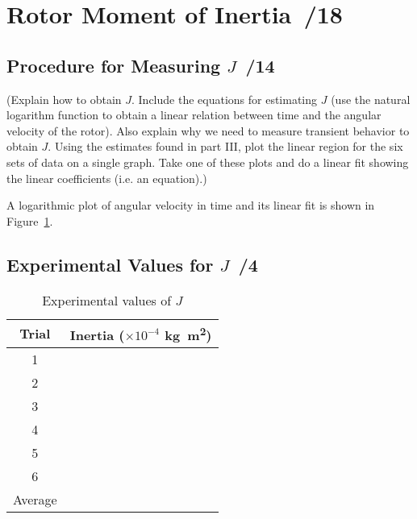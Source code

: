 \documentclass{article}
\newcommand{\score}{\hfill \underline{\hspace{0.65cm}}\,/} %
\begin{document}
\section{Rotor Moment of Inertia \score 18}
\subsection{Procedure for Measuring $J$ \score 14}
(Explain how to obtain $J$. Include the equations for estimating $J$ (use the natural logarithm function to obtain a linear relation between time and the angular velocity of the rotor). Also explain why we need to measure transient behavior to obtain $J$. Using the estimates found in part III, plot the linear region for the six sets of data on a single graph. Take one of these plots and do a linear fit showing the linear coefficients (i.e. an equation).)

A logarithmic plot of angular velocity in time and its linear fit is shown in Figure~\ref{fig:lab4_q5}.



\subsection{Experimental Values for $J$ \score 4}
\begin{table}[phtb] \label{fig:lab4_q5}
\begin{center}
\caption{Experimental values of $J$}
\begin{tabular}{c|l}\hline \hline
\cellcolor{lightgray} Trial & \cellcolor{lightgray} Inertia ($\times10^{-4}$ \si{\kg\m\squared}) \\
\hline
1 &  \\ \hline
2 &  \\ \hline
3 &  \\ \hline
4 &  \\ \hline
5 &  \\ \hline
6 &  \\ \hline
Average &  \\ \hline
\end{tabular}
\end{center}
\end{table}
\end{document}
